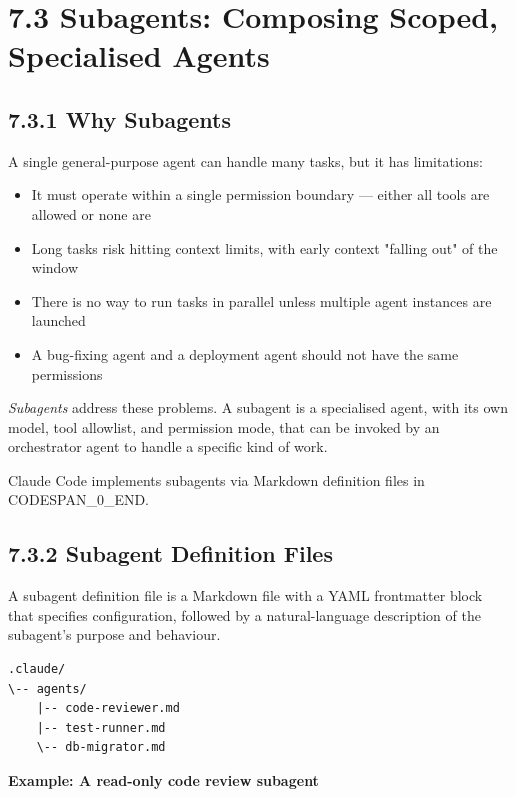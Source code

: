 \documentclass[11pt,a4paper]{book}
\begin{document}
\section{7.3 Subagents: Composing Scoped, Specialised Agents}

\subsection{7.3.1 Why Subagents}

A single general-purpose agent can handle many tasks, but it has limitations:

\begin{itemize}
  \item It must operate within a single permission boundary --- either all tools are allowed or none are
  \item Long tasks risk hitting context limits, with early context "falling out" of the window
  \item There is no way to run tasks in parallel unless multiple agent instances are launched
  \item A bug-fixing agent and a deployment agent should not have the same permissions
\end{itemize}

\textit{Subagents} address these problems. A subagent is a specialised agent, with its own model, tool allowlist, and permission mode, that can be invoked by an orchestrator agent to handle a specific kind of work.

Claude Code implements subagents via Markdown definition files in CODESPAN\_0\_END.

\subsection{7.3.2 Subagent Definition Files}

A subagent definition file is a Markdown file with a YAML frontmatter block that specifies configuration, followed by a natural-language description of the subagent's purpose and behaviour.

\begin{lstlisting}
.claude/
\-- agents/
    |-- code-reviewer.md
    |-- test-runner.md
    \-- db-migrator.md
\end{lstlisting}

\textbf{Example: A read-only code review subagent}
\end{document}
